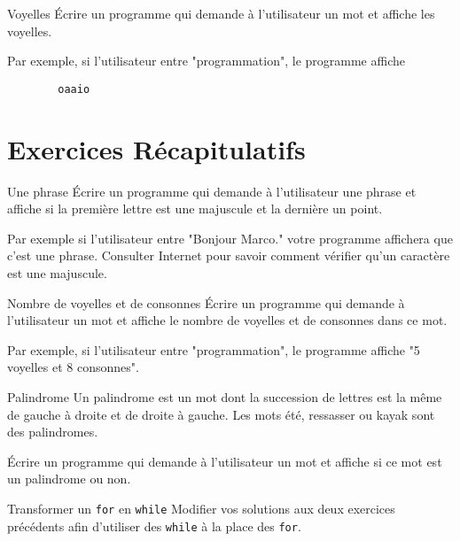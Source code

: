 \documentclass[a4paper,11pt]{article}
\begin{document}
	\begin{Exercice}{Voyelles}	
		\'Ecrire un programme qui demande à l'utilisateur 
		un mot et affiche les voyelles.
		
		Par exemple, si l'utilisateur entre "programmation", le programme affiche
		
		\begin{verbatim}
		oaaio
		\end{verbatim}
	\end{Exercice}

\section{Exercices Récapitulatifs}

	\begin{Exercice}{Une phrase}	
		\'Ecrire un programme qui demande à l'utilisateur 
		une phrase et affiche si la première lettre est une majuscule et la dernière un point.
		
		Par exemple si l'utilisateur entre "Bonjour Marco." votre programme affichera que c'est une phrase.
		Consulter Internet pour savoir comment vérifier qu'un caractère est une majuscule. 
		
	\end{Exercice}

	\begin{Exercice}{Nombre de voyelles et de consonnes}	
		\'Ecrire un programme qui demande à l'utilisateur 
		un mot et affiche le nombre de voyelles et de consonnes dans ce mot.
		
		Par exemple, si l'utilisateur entre "programmation", le programme affiche "5 voyelles et 8 consonnes".	
	\end{Exercice}


	\begin{Exercice}{Palindrome}
		Un palindrome est un mot dont la succession de lettres est la même 
		de gauche à droite et de droite à gauche. 
		Les mots été, ressasser ou kayak sont des palindromes.
		  	
		\'Ecrire un programme qui demande à l'utilisateur 
		un mot et affiche si ce mot est un palindrome ou non.
	\end{Exercice}

	\begin{Exercice}{Transformer un \texttt{for} en \texttt{while}}
		Modifier vos solutions aux deux exercices précédents afin d'utiliser des \texttt{while} à la place des \texttt{for}. 
	\end{Exercice}

	
\end{document}

